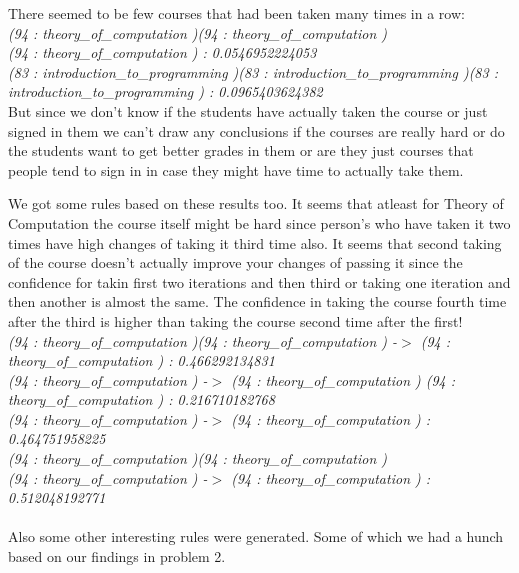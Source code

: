 There seemed to be few courses that had been taken many times in a row:\\

\textit{
(94 : theory\_of\_computation )(94 : theory\_of\_computation ) \\(94 : theory\_of\_computation ) :  0.0546952224053\\
(83 : introduction\_to\_programming )(83 : introduction\_to\_programming )(83 : introduction\_to\_programming ) :  0.0965403624382
}\\

But since we don't know if the students have actually taken the course or just signed in them we can't draw any
conclusions if the courses are really hard or do the students want to get better grades in them or are they just
courses that people tend to sign in in case they might have time to actually take them. 

We got some rules based on these results too. It seems that atleast for Theory of Computation the course itself
might be hard since person's who have taken it two times have high changes of taking it third time also. It seems 
that second taking of the course doesn't actually improve your changes of passing it since the confidence for
takin first two iterations and then third or taking one iteration and then another is almost the same. The 
confidence in taking the course fourth time after the third is higher than taking the course second time 
after the first!\\

\textit{
(94 : theory\_of\_computation )(94 : theory\_of\_computation ) -$>$  (94 : theory\_of\_computation ) :  0.466292134831\\
(94 : theory\_of\_computation ) -$>$ (94 : theory\_of\_computation ) (94 : theory\_of\_computation ) :  0.216710182768\\
(94 : theory\_of\_computation ) -$>$ (94 : theory\_of\_computation ) :  0.464751958225\\
(94 : theory\_of\_computation )(94 : theory\_of\_computation ) \\ (94 : theory\_of\_computation ) -$>$ (94 : theory\_of\_computation ) :  0.512048192771\\
}\\

Also some other interesting rules were generated. Some of which we had a hunch based on our findings in problem 2.\\

